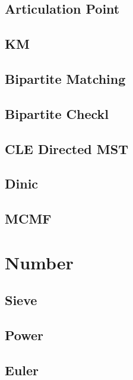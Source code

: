 \subsection{Articulation Point}


\subsection{KM}


\subsection{Bipartite Matching}


\subsection{Bipartite Checkl}


\subsection{CLE Directed MST}


\subsection{Dinic}


\subsection{MCMF}

\section{Number}

\subsection{Sieve}


\subsection{Power}


\subsection{Euler}


